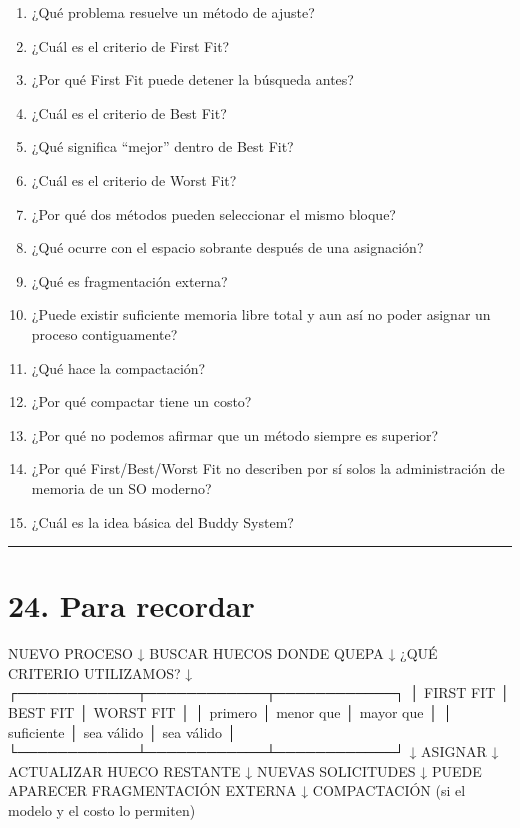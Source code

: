 \documentclass[
  spanish,
  letterpaper,
]{scrbook}
\newenvironment{Shaded}{\begin{snugshade}}{\end{snugshade}}
\newcommand{\NormalTok}[1]{\textcolor[rgb]{0.00,0.23,0.31}{#1}}
\providecommand{\tightlist}{%
  \setlength{\itemsep}{0pt}\setlength{\parskip}{0pt}}
\begin{document}
\begin{enumerate}
\def\labelenumi{\arabic{enumi}.}
\tightlist
\item
  ¿Qué problema resuelve un método de ajuste?
\item
  ¿Cuál es el criterio de First Fit?
\item
  ¿Por qué First Fit puede detener la búsqueda antes?
\item
  ¿Cuál es el criterio de Best Fit?
\item
  ¿Qué significa ``mejor'' dentro de Best Fit?
\item
  ¿Cuál es el criterio de Worst Fit?
\item
  ¿Por qué dos métodos pueden seleccionar el mismo bloque?
\item
  ¿Qué ocurre con el espacio sobrante después de una asignación?
\item
  ¿Qué es fragmentación externa?
\item
  ¿Puede existir suficiente memoria libre total y aun así no poder
  asignar un proceso contiguamente?
\item
  ¿Qué hace la compactación?
\item
  ¿Por qué compactar tiene un costo?
\item
  ¿Por qué no podemos afirmar que un método siempre es superior?
\item
  ¿Por qué First/Best/Worst Fit no describen por sí solos la
  administración de memoria de un SO moderno?
\item
  ¿Cuál es la idea básica del Buddy System?
\end{enumerate}

\begin{center}\rule{0.5\linewidth}{0.5pt}\end{center}


\chapter{24. Para recordar}\label{para-recordar-7}

\begin{Shaded}
\begin{Highlighting}[]
\NormalTok{NUEVO PROCESO}
\NormalTok{      ↓}
\NormalTok{BUSCAR HUECOS DONDE QUEPA}
\NormalTok{      ↓}
\NormalTok{¿QUÉ CRITERIO UTILIZAMOS?}
\NormalTok{      ↓}
\NormalTok{┌────────────┬────────────┬────────────┐}
\NormalTok{│ FIRST FIT  │ BEST FIT   │ WORST FIT  │}
\NormalTok{│ primero    │ menor que  │ mayor que  │}
\NormalTok{│ suficiente │ sea válido │ sea válido │}
\NormalTok{└────────────┴────────────┴────────────┘}
\NormalTok{      ↓}
\NormalTok{ASIGNAR}
\NormalTok{      ↓}
\NormalTok{ACTUALIZAR HUECO RESTANTE}
\NormalTok{      ↓}
\NormalTok{NUEVAS SOLICITUDES}
\NormalTok{      ↓}
\NormalTok{PUEDE APARECER FRAGMENTACIÓN EXTERNA}
\NormalTok{      ↓}
\NormalTok{COMPACTACIÓN (si el modelo y el costo lo permiten)}
\end{Highlighting}
\end{Shaded}
\end{document}
